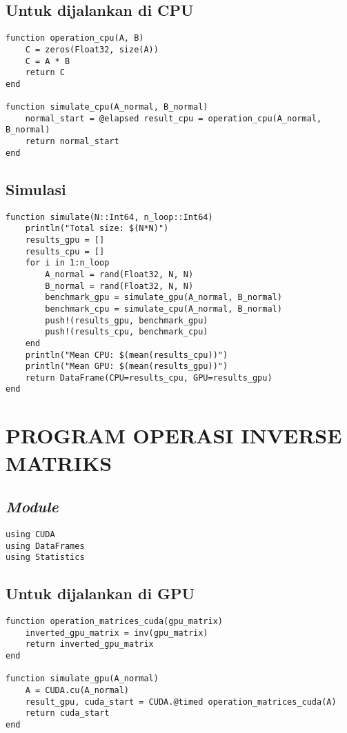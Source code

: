 \section{Untuk dijalankan di CPU}

\begin{lstlisting}
function operation_cpu(A, B)
    C = zeros(Float32, size(A))
    C = A * B
    return C
end

function simulate_cpu(A_normal, B_normal)
    normal_start = @elapsed result_cpu = operation_cpu(A_normal, B_normal)
    return normal_start
end
\end{lstlisting}

\section{Simulasi}

\begin{lstlisting}
function simulate(N::Int64, n_loop::Int64)
    println("Total size: $(N*N)")
    results_gpu = []
    results_cpu = []
    for i in 1:n_loop
        A_normal = rand(Float32, N, N)
        B_normal = rand(Float32, N, N)
        benchmark_gpu = simulate_gpu(A_normal, B_normal)
        benchmark_cpu = simulate_cpu(A_normal, B_normal)
        push!(results_gpu, benchmark_gpu)
        push!(results_cpu, benchmark_cpu)
    end
    println("Mean CPU: $(mean(results_cpu))")
    println("Mean GPU: $(mean(results_gpu))")
    return DataFrame(CPU=results_cpu, GPU=results_gpu)
end
\end{lstlisting}


\chapter{PROGRAM OPERASI INVERSE MATRIKS}
\label{appx:inverse}

\section{\emph{Module}}

\begin{lstlisting}
using CUDA
using DataFrames
using Statistics
\end{lstlisting}

\section{Untuk dijalankan di GPU}

\begin{lstlisting}
function operation_matrices_cuda(gpu_matrix)
    inverted_gpu_matrix = inv(gpu_matrix)  
    return inverted_gpu_matrix  
end

function simulate_gpu(A_normal)
    A = CUDA.cu(A_normal)  
    result_gpu, cuda_start = CUDA.@timed operation_matrices_cuda(A)
    return cuda_start 
end
\end{lstlisting}

